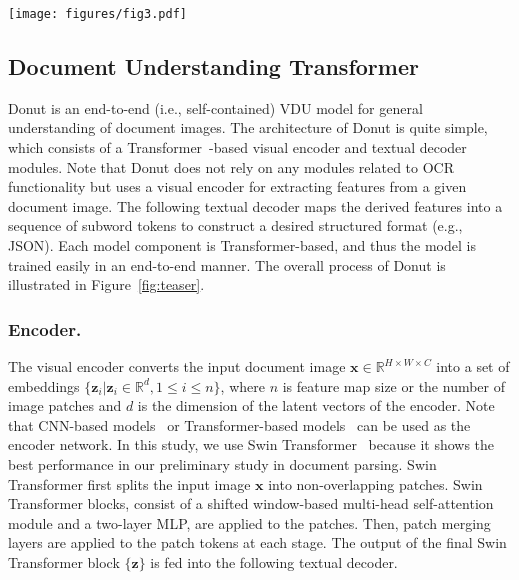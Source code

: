 \documentclass[runningheads]{llncs}
\newcommand\ours{{{\mbox{Donut}}}\xspace}
\newcommand\oursb{{\textbf{\mbox{Donut}}}\xspace}
\begin{document}
\begin{figure*}[t!]
    \centering
    \texttt{[image: figures/fig3.pdf]}
    \caption{{\bf The pipeline of \oursb.} The encoder maps a given document image into embeddings. With the encoded embeddings, the decoder generates a sequence of tokens that can be converted into a target type of information in a structured form} \label{fig:teaser}
\end{figure*}

\subsection{Document Understanding Transformer}
\ours is an end-to-end (i.e., self-contained) VDU model for general understanding of document images. The architecture of \ours is quite simple, which consists of a Transformer~\cite{vaswani2017transformer,dosovitskiy2020vit}-based visual encoder and textual decoder modules. Note that \ours does not rely on any modules related to OCR functionality but uses a visual encoder for extracting features from a given document image. The following textual decoder maps the derived features into a sequence of subword tokens to construct a desired structured format (e.g., JSON). Each model component is Transformer-based, and thus the model is trained easily in an end-to-end manner. The overall process of \ours is illustrated in Figure~\ref{fig:teaser}.



\subsubsection{Encoder.}


The visual encoder converts the input document image $\mathbf{x}{\in}\mathbb{R}^{H\times W\times C}$ into a set of embeddings $\{\mathbf{z}_{i} | \mathbf{z}_{i}{\in}\mathbb{R}^{d}, 1{\le}i{\le}n\}$, where $n$ is feature map size or the number of image patches and  $d$ is the dimension of the latent vectors of the encoder.
Note that CNN-based models~\cite{HeZRS16} or Transformer-based models~\cite{dosovitskiy2020vit,Liu_2021_ICCV} can be used as the encoder network. In this study, we use Swin Transformer~\cite{Liu_2021_ICCV} because it shows the best performance in our preliminary study in document parsing. Swin Transformer first splits the input image $\mathbf{x}$ into non-overlapping patches.
Swin Transformer blocks, consist of a shifted window-based multi-head self-attention module and a two-layer MLP, are applied to the patches.
Then, patch merging layers are applied to the patch tokens at each stage.
The output of the final Swin Transformer block $\{\mathbf{z}\}$ is fed into the following textual decoder.
\end{document}
